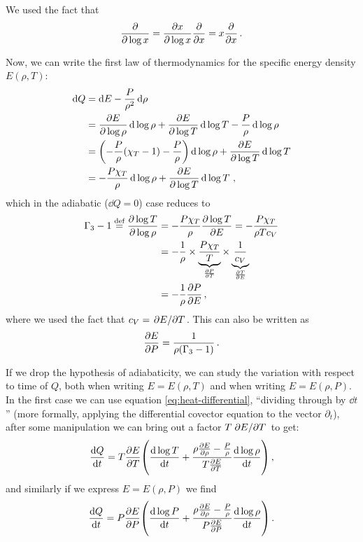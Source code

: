 \documentclass[main.tex]{subfiles}
\begin{document}
We used the fact that 
%
\begin{align}
\pdv{}{\log x} = \pdv{x}{\log x} \pdv{}{x}= x \pdv{}{x} 
\,.
\end{align}

Now, we can write the first law of thermodynamics for the specific energy density \(E(\rho, T)\): 
%
\begin{align}
\dd{Q} &= \dd{E} - \frac{P}{\rho^2} \dd{\rho }  \label{eq:heat-differential}\\
&= \pdv{E}{\log \rho } \dd{\log \rho } 
+ \pdv{E }{\log T} \dd{\log T} - \frac{P}{\rho}  \dd{\log \rho }  \\
&= \qty(- \frac{P}{\rho } \qty(\chi_{T} -1) - \frac{P}{\rho }) \dd{\log \rho } + \pdv{E}{\log T} \dd{\log T}  \\
&= - \frac{P \chi_T }{\rho } \dd{\log \rho } + \pdv{E}{\log T} \dd{\log T} 
\,,
\end{align}
%
which in the adiabatic (\(\dd{Q} = 0\)) case reduces to 
%
\begin{align}
\Gamma_3 - 1 \overset{\text{def}}{=} \pdv{\log T }{\log \rho } &= - \frac{P \chi_{T}  }{\rho } \pdv{\log T}{E} = - \frac{P \chi_T }{\rho T c_V}  \\
&=- \frac{1}{\rho } \times \underbrace{\frac{P \chi_T}{T}}_{\pdv{P}{T}} \times \underbrace{\frac{1}{c_V}}_{\pdv{T}{E}}  \\
&= - \frac{1}{\rho } \pdv{P}{E}
\,,
\end{align}
%
where we used the fact that \(c_V = \pdv*{E}{T}\). This can also be written as 
%
\begin{align}
\pdv{E}{P} = \frac{1}{\rho (\Gamma_3 -1)}
\,.
\end{align}

If we drop the hypothesis of adiabaticity, we can study the variation with respect to time of \(Q\), both when writing \(E = E(\rho , T)\) and when writing \(E = E(\rho , P)\). 
In the first case we can use equation \eqref{eq:heat-differential}, ``dividing through by \(\dd{t}\)'' (more formally, applying the differential covector equation to the vector \(\partial_{t}\)), after some manipulation we can bring out a factor \(T \pdv*{E}{T}\) to get: 
%
\begin{align} \label{eq:heat-variation-temperature-dependence}
\dv{Q}{t} = T \pdv{E}{T} \qty(\dv{\log T}{t} + \frac{\rho \pdv{E}{\rho } - \frac{P}{\rho }}{T \pdv{E}{T}} \dv{\log \rho }{t})
\,,
\end{align}
%
and similarly if we express \(E = E(\rho, P)\) we find 
%
\begin{align}\label{eq:heat-variation-pressure-dependence}
\dv{Q}{t} = P \pdv{E}{P} \qty(\dv{\log P}{t} + \frac{\rho \pdv{E}{\rho } - \frac{P}{\rho }}{P \pdv{E}{P}} \dv{\log \rho }{t})
\,.
\end{align}
\end{document}
